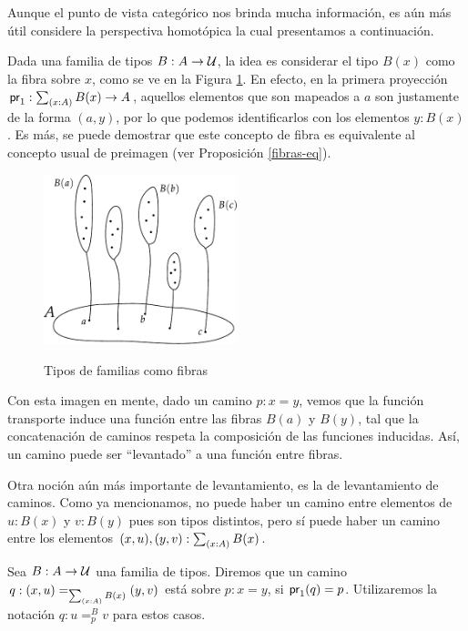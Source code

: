 \documentclass[../main.tex]{subfiles}
\begin{document}
Aunque el punto de vista categ\'orico nos brinda mucha informaci\'on, es a\'un m\'as \'util considere la perspectiva homot\'opica la cual presentamos a continuaci\'on.

Dada una familia de tipos $B:A \to \mathcal{U}$, la idea es considerar el tipo $B(x)$ como la fibra sobre $x$, como se ve en la Figura \ref{fig-fibras}.
En efecto, en la primera proyecci\'on $\fst: \tsm{x:A}B(x) \to A$, aquellos elementos que son mapeados a $a$ son justamente de la forma $(a,y)$, por lo que podemos identificarlos con los elementos $y:B(x)$. Es m\'as, se puede demostrar que este concepto de fibra es equivalente al concepto usual de preimagen (ver Proposici\'on \ref{fibras-eq}).

\begin{figure}[h]
  \caption{Tipos de familias como fibras}
  \centering
  \vspace{1em}
  \includegraphics[width=0.5\textwidth]{images/fibras}
  \label{fig-fibras}
\end{figure}

Con esta imagen en mente, dado un camino $p:x=y$, vemos que la función transporte induce una función entre las fibras $B(a)$ y $B(y)$, tal que la concatenaci\'on de caminos respeta la composición de las funciones inducidas.
As\'i, un camino puede ser ``levantado'' a una funci\'on entre fibras.

Otra noci\'on a\'un m\'as importante de levantamiento, es la de levantamiento de caminos.
Como ya mencionamos, no puede haber un camino entre elementos de $u:B(x)$ y $v:B(y)$ pues son tipos distintos, pero s\'i puede haber un camino entre los elementos $(x,u),(y,v):\tsm{x:A}B(x)$.

\begin{definition}
  Sea $B:A\to \mathcal{U}$ una familia de tipos. Diremos que un camino $q:\id[\sm{x:A}B(x)]{(x,u)}{(y,v)}$ est\'a sobre $p:x=y$, si $\mathsf{pr}_{1}(q) = p$. Utilizaremos la notaci\'on $q: u =_p^B v$ para estos casos.
\end{definition}
\end{document}
